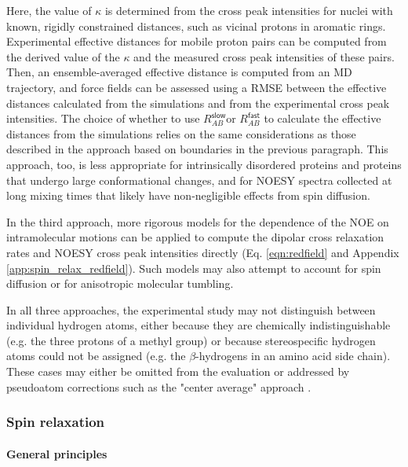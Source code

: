 \documentclass[9pt,review]{livecoms}
\begin{document}
Here, the value of $\kappa$ is determined from the cross peak intensities for nuclei with known, rigidly constrained distances, such as vicinal protons in aromatic rings.
Experimental effective distances for mobile proton pairs can be computed from the derived value of the $\kappa$ and the measured cross peak intensities of these pairs.
Then, an ensemble-averaged effective distance is computed from an MD trajectory, and force fields can be assessed using a RMSE between the effective distances calculated from the simulations and from the experimental cross peak intensities.
The choice of whether to use $R_{AB}^{\mathsf{slow}}$or $R_{AB}^{\mathsf{fast}}$ to calculate the effective distances from the simulations relies on the same considerations as those described in the approach based on boundaries in the previous paragraph.
This approach, too, is less appropriate for intrinsically disordered proteins and proteins that undergo large conformational changes, and for NOESY spectra collected at long mixing times that likely have non-negligible effects from spin diffusion.

In the third approach, more rigorous models for the dependence of the NOE on intramolecular motions \cite{peter_calculation_2001,vogeli_nuclear_2014} can be applied to compute the dipolar cross relaxation rates and NOESY cross peak intensities directly (Eq. \ref{eqn:redfield} and Appendix \ref{app:spin_relax_redfield}).
Such models may also attempt to account for spin diffusion or for anisotropic molecular tumbling.

In all three approaches, the experimental study may not distinguish between individual hydrogen atoms, either because they are chemically indistinguishable (e.g. the three protons of a methyl group) or because stereospecific hydrogen atoms could not be assigned (e.g. the $\beta$-hydrogens in an amino acid side chain).
These cases may either be omitted from the evaluation or addressed by pseudoatom corrections such as the "center average" approach \cite{wuthrich_pseudo-structures_1983,fletcher_treatment_1996}.

\subsubsection{Spin relaxation}
\label{sub2:spin_relax}

\paragraph{General principles}
\end{document}
